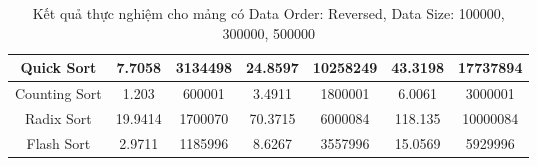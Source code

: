 \begin{table}[H]
{\begin{tabular}{|ccccccc|}
\multicolumn{1}{|c|}{Quick Sort} & \multicolumn{1}{c|}{7.7058} & \multicolumn{1}{c|}{3134498} & \multicolumn{1}{c|}{24.8597} & \multicolumn{1}{c|}{10258249} & \multicolumn{1}{c|}{43.3198} & \multicolumn{1}{c|}{17737894} \\ \hline
\multicolumn{1}{|c|}{Counting Sort} & \multicolumn{1}{c|}{1.203} & \multicolumn{1}{c|}{600001} & \multicolumn{1}{c|}{3.4911} & \multicolumn{1}{c|}{1800001} & \multicolumn{1}{c|}{6.0061} & \multicolumn{1}{c|}{3000001} \\ \hline
\multicolumn{1}{|c|}{Radix Sort} & \multicolumn{1}{c|}{19.9414} & \multicolumn{1}{c|}{1700070} & \multicolumn{1}{c|}{70.3715} & \multicolumn{1}{c|}{6000084} & \multicolumn{1}{c|}{118.135} & \multicolumn{1}{c|}{10000084} \\ \hline
\multicolumn{1}{|c|}{Flash Sort} & \multicolumn{1}{c|}{2.9711} & \multicolumn{1}{c|}{1185996} & \multicolumn{1}{c|}{8.6267} & \multicolumn{1}{c|}{3557996} & \multicolumn{1}{c|}{15.0569} & \multicolumn{1}{c|}{5929996} \\ \hline
\end{tabular}%
}
\caption{Kết quả thực nghiệm cho mảng có Data Order: Reversed, Data Size: 100000, 300000, 500000}
\label{tab:reversed_100000_300000_500000}
\end{table}

